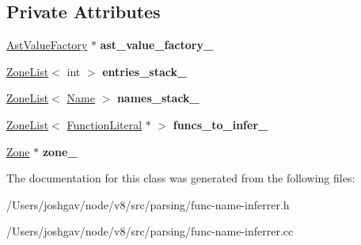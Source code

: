 \subsection*{Private Attributes}
\begin{DoxyCompactItemize}
\item 
\hyperlink{classv8_1_1internal_1_1_ast_value_factory}{Ast\+Value\+Factory} $\ast$ {\bfseries ast\+\_\+value\+\_\+factory\+\_\+}\hypertarget{classv8_1_1internal_1_1_func_name_inferrer_a79237306b01548933b30be778f92be6f}{}\label{classv8_1_1internal_1_1_func_name_inferrer_a79237306b01548933b30be778f92be6f}

\item 
\hyperlink{classv8_1_1internal_1_1_zone_list}{Zone\+List}$<$ int $>$ {\bfseries entries\+\_\+stack\+\_\+}\hypertarget{classv8_1_1internal_1_1_func_name_inferrer_a0e34b5786b16f26875cc007db061bb51}{}\label{classv8_1_1internal_1_1_func_name_inferrer_a0e34b5786b16f26875cc007db061bb51}

\item 
\hyperlink{classv8_1_1internal_1_1_zone_list}{Zone\+List}$<$ \hyperlink{structv8_1_1internal_1_1_func_name_inferrer_1_1_name}{Name} $>$ {\bfseries names\+\_\+stack\+\_\+}\hypertarget{classv8_1_1internal_1_1_func_name_inferrer_ae485bf4414ed6b8e5ee61ccdff89cd2b}{}\label{classv8_1_1internal_1_1_func_name_inferrer_ae485bf4414ed6b8e5ee61ccdff89cd2b}

\item 
\hyperlink{classv8_1_1internal_1_1_zone_list}{Zone\+List}$<$ \hyperlink{classv8_1_1internal_1_1_function_literal}{Function\+Literal} $\ast$ $>$ {\bfseries funcs\+\_\+to\+\_\+infer\+\_\+}\hypertarget{classv8_1_1internal_1_1_func_name_inferrer_a74babe884daf7160e6079279ae96b20d}{}\label{classv8_1_1internal_1_1_func_name_inferrer_a74babe884daf7160e6079279ae96b20d}

\item 
\hyperlink{classv8_1_1internal_1_1_zone}{Zone} $\ast$ {\bfseries zone\+\_\+}\hypertarget{classv8_1_1internal_1_1_func_name_inferrer_ac41badd76feaad28678600005e30fd77}{}\label{classv8_1_1internal_1_1_func_name_inferrer_ac41badd76feaad28678600005e30fd77}

\end{DoxyCompactItemize}


The documentation for this class was generated from the following files\+:\begin{DoxyCompactItemize}
\item 
/\+Users/joshgav/node/v8/src/parsing/func-\/name-\/inferrer.\+h\item 
/\+Users/joshgav/node/v8/src/parsing/func-\/name-\/inferrer.\+cc\end{DoxyCompactItemize}
